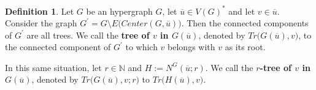 \documentclass[12pt,notitlepage,a4paper]{article}
\theoremstyle{definition}
\newtheorem{definition}{Definition}[section]
\newcommand{\N}{\mathbb{N}}
\begin{document}
\begin{definition}
	Let $G$ be an hypergraph $G$, let $\overline{u}\in V(G)^*$
	and let $v\in \overline{u}$.
	Consider the graph $G^\prime= G\setminus 
	E\big(Center(G,\overline{u})\big)$. Then the connected components of
	$G^\prime$ are all trees. We call the \textbf{tree of $v$ in
	$G(\overline{u})$}, denoted by $Tr\big(G(\overline{u}),v\big)$,
	to the connected component of $G^\prime$ to which $v$ belongs
	with $v$ as its root. \par   
	In this same situation, let $r\in \N$ and $H:=N^G(\overline{u};r)$.
	We call the \textbf{$r$-tree of $v$ in $G(\overline{u})$}, 
	denoted by $Tr\big(G(\overline{u}),v;r\big)$ to 
	$Tr\big(H(\overline{u}),v\big)$.
\end{definition}

\newpage
\end{document}
